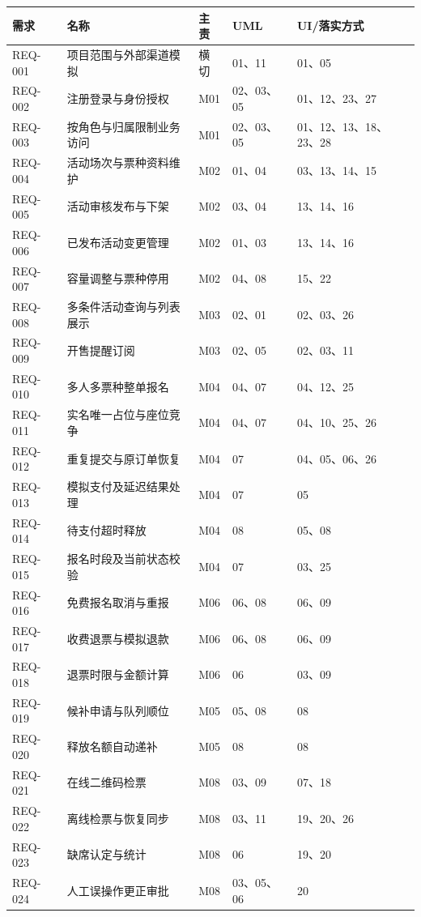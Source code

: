 \documentclass[UTF8,zihao=-4,fontset=windows]{ctexart}
\begin{document}
\begin{small}\begin{longtable}{p{17mm}p{40mm}p{16mm}p{20mm}p{45mm}}\toprule 需求 & 名称 & 主责 & UML & UI/落实方式\\\midrule\endhead
REQ-001 & 项目范围与外部渠道模拟 & 横切 & 01、11 & 01、05 \\
REQ-002 & 注册登录与身份授权 & M01 & 02、03、05 & 01、12、23、27 \\
REQ-003 & 按角色与归属限制业务访问 & M01 & 02、03、05 & 01、12、13、18、23、28 \\
REQ-004 & 活动场次与票种资料维护 & M02 & 01、04 & 03、13、14、15 \\
REQ-005 & 活动审核发布与下架 & M02 & 03、04 & 13、14、16 \\
REQ-006 & 已发布活动变更管理 & M02 & 01、03 & 13、14、16 \\
REQ-007 & 容量调整与票种停用 & M02 & 04、08 & 15、22 \\
REQ-008 & 多条件活动查询与列表展示 & M03 & 02、01 & 02、03、26 \\
REQ-009 & 开售提醒订阅 & M03 & 02、05 & 02、03、11 \\
REQ-010 & 多人多票种整单报名 & M04 & 04、07 & 04、12、25 \\
REQ-011 & 实名唯一占位与座位竞争 & M04 & 04、07 & 04、10、25、26 \\
REQ-012 & 重复提交与原订单恢复 & M04 & 07 & 04、05、06、26 \\
REQ-013 & 模拟支付及延迟结果处理 & M04 & 07 & 05 \\
REQ-014 & 待支付超时释放 & M04 & 08 & 05、08 \\
REQ-015 & 报名时段及当前状态校验 & M04 & 07 & 03、25 \\
REQ-016 & 免费报名取消与重报 & M06 & 06、08 & 06、09 \\
REQ-017 & 收费退票与模拟退款 & M06 & 06、08 & 06、09 \\
REQ-018 & 退票时限与金额计算 & M06 & 06 & 03、09 \\
REQ-019 & 候补申请与队列顺位 & M05 & 05、08 & 08 \\
REQ-020 & 释放名额自动递补 & M05 & 08 & 08 \\
REQ-021 & 在线二维码检票 & M08 & 03、09 & 07、18 \\
REQ-022 & 离线检票与恢复同步 & M08 & 03、11 & 19、20、26 \\
REQ-023 & 缺席认定与统计 & M08 & 06 & 19、20 \\
REQ-024 & 人工误操作更正审批 & M08 & 03、05、06 & 20 \\

\end{longtable}
\end{small}
\end{document}
